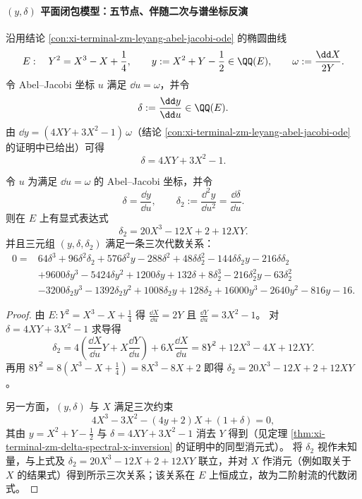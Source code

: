 \paragraph{\texorpdfstring{$(y,\delta)$}{(y,delta)} 平面闭包模型：五节点、伴随二次与谱坐标反演}
沿用结论 \ref{con:xi-terminal-zm-leyang-abel-jacobi-ode} 的椭圆曲线
\[
E:\quad Y^{2}=X^{3}-X+\frac14,
\qquad
y:=X^{2}+Y-\frac12\in\QQ(E),
\qquad
\omega:=\frac{\dd X}{2Y}.
\]
令 Abel--Jacobi 坐标 \(u\) 满足 \(\dd u=\omega\)，并令
\[
\delta:=\frac{\dd y}{\dd u}\in\QQ(E).
\]
由 \(\dd y=(4XY+3X^{2}-1)\,\omega\)（结论 \ref{con:xi-terminal-zm-leyang-abel-jacobi-ode} 的证明中已给出）可得
\[
\delta=4XY+3X^{2}-1.
\]

\begin{theorem}[二阶射流的三次代数闭式]\label{thm:xi-terminal-zm-leyang-second-jet-cubic-closure}
令 \(u\) 为满足 \(\dd u=\omega\) 的 Abel--Jacobi 坐标，并令
\[
\delta=\frac{\dd y}{\dd u},
\qquad
\delta_{2}:=\frac{\dd^{2}y}{\dd u^{2}}=\frac{\dd\delta}{\dd u}.
\]
则在 \(E\) 上有显式表达式
\[
\delta_{2}=20X^{3}-12X+2+12XY.
\]
并且三元组 \((y,\delta,\delta_2)\) 满足一条三次代数关系：
\[
\begin{aligned}
0={}&64\delta^{3}+96\delta^{2}\delta_{2}+576\delta^{2}y-288\delta^{2}+48\delta\delta_{2}^{2}-144\delta\delta_{2}y-216\delta\delta_{2}\\
&+9600\delta y^{3}-5424\delta y^{2}+1200\delta y+132\delta+8\delta_{2}^{3}-216\delta_{2}^{2}y-63\delta_{2}^{2}\\
&-3200\delta_{2}y^{3}-1392\delta_{2}y^{2}+1008\delta_{2}y+128\delta_{2}+16000y^{3}-2640y^{2}-816y-16.
\end{aligned}
\]
\end{theorem}
\begin{proof}
由 \(E:Y^2=X^3-X+\tfrac14\) 得 \(\frac{\dd X}{\dd u}=2Y\) 且 \(\frac{\dd Y}{\dd u}=3X^2-1\)。
对 \(\delta=4XY+3X^2-1\) 求导得
\[
\delta_2
=4\left(\frac{\dd X}{\dd u}Y+X\frac{\dd Y}{\dd u}\right)+6X\frac{\dd X}{\dd u}
=8Y^2+12X^3-4X+12XY.
\]
再用 \(8Y^2=8(X^3-X+\tfrac14)=8X^3-8X+2\) 即得 \(\delta_2=20X^3-12X+2+12XY\)。
\par
另一方面，\((y,\delta)\) 与 \(X\) 满足三次约束
\[
4X^{3}-3X^{2}-(4y+2)X+(1+\delta)=0,
\]
其由 \(y=X^2+Y-\tfrac12\) 与 \(\delta=4XY+3X^2-1\) 消去 \(Y\) 得到（见定理 \ref{thm:xi-terminal-zm-delta-spectral-x-inversion} 的证明中的同型消元式）。
将 \(\delta_2\) 视作未知量，与上式及 \(\delta_2=20X^{3}-12X+2+12XY\) 联立，并对 \(X\) 作消元（例如取关于 \(X\) 的结果式）得到所示三次关系；该关系在 \(E\) 上恒成立，故为二阶射流的代数闭式。
\end{proof}

